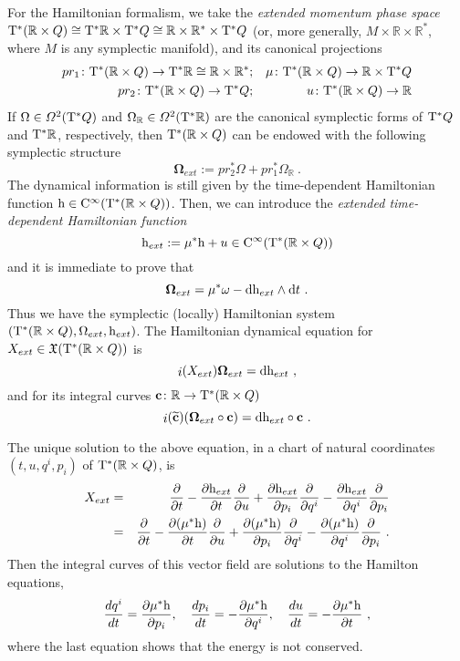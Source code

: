 \documentclass[12pt]{report}
\def\beann{\begin{eqnarray*}}
\def\eeann{\end{eqnarray*}}
\def\derpar#1#2{\frac{\partial{#1}}{\partial{#2}}}
\def\vf{\mathfrak X}
\def\df{{\mit\Omega}}
\def\d{{\rm d}}
\def\Real{\mathbb{R}}
\def\Tan{{\rm T}}
\def\inn{\mathop{i}\nolimits}
\def\Cinfty{{\rm C}^\infty}
\begin{document}
For the Hamiltonian formalism, we take the
{\sl extended momentum phase space}
$\Tan^*(\Real \times Q) \cong
 \Tan^*\Real\times\Tan^*Q \cong
 \Real \times \Real^*\times\Tan^*Q$
(or, more generally, $M \times \Real \times \Real^*$,
where $M$ is any symplectic manifold), and its  canonical projections
\beann
pr_1\colon\Tan^*(\Real \times Q)\to\Tan^*\Real \cong\Real \times \Real^*
&;&
\mu\colon \Tan^*(\Real \times Q) \to \Real\times\Tan^*Q
\\
pr_2\colon \Tan^*(\Real \times Q)\to \Tan^*Q
&;&
u\colon\Tan^*(\Real \times Q) \to \Real
\eeann
If $\Omega \in\df^2(\Tan^*Q)$ and $\Omega_{\Real} \in\df^2(\Tan^*\Real )$
are the canonical symplectic forms of $\Tan^*Q$ and $\Tan^*\Real $, respectively,
then $\Tan^*(\Real \times Q)$
can be endowed with the following symplectic structure
$$
{\mathbf \Omega}_{ext} := pr_2^* \Omega +pr_1^* \Omega_{\Real} \ .
$$
The dynamical information is still given by the time-dependent Hamiltonian function
${\rm h} \in \Cinfty(\Tan^*(\Real \times Q))$.
Then, we can introduce the {\sl extended time-dependent Hamiltonian function}
$$
{\rm h}_{ext} := \mu^* {\rm h} + u \in \Cinfty(\Tan^*(\Real \times Q))
$$
and it is immediate to prove that
$$
{\mathbf \Omega}_{ext} = \mu^* \omega - \d{\rm h}_{ext} \wedge\d t \ .
$$
Thus we have the symplectic (locally) Hamiltonian system
$(\Tan^*(\Real \times Q),\Omega_{ext},{\rm h}_{ext})$.
The Hamiltonian dynamical equation for $X_{ext}\in\vf(\Tan^*(\Real \times Q))$ is
$$
\inn(X_{ext}){\mathbf \Omega}_{ext} = \d{\rm h}_{ext}  \ ,
$$
and for its integral curves ${\bf c}\colon\Real\to\Tan^*(\Real\times Q)$ 
$$
\inn(\widetilde{\bf c})({\mathbf \Omega}_{ext}\circ{\bf c}) = \d{\rm h}_{ext}\circ{\bf c}  \ .
$$

The unique solution to the above equation, in a chart of natural coordinates
$(t,u,q^i,p_i)$ of $\Tan^*(\Real \times Q)$, is
\beann
X_{ext}&=&
\derpar{}{t} -
\derpar{{\rm h}_{ext}}{t}\derpar{}{u}+
\derpar{{\rm h}_{ext}}{p_i} \derpar{}{q^i} -
\derpar{{\rm h}_{ext}}{q^i} \derpar{}{p_i}
\\
&=&
\derpar{}{t} -
\derpar{(\mu^*{\rm h})}{t}\derpar{}{u}+
\derpar{(\mu^*{\rm h})}{p_i} \derpar{}{q^i} -
\derpar{(\mu^*{\rm h})}{q^i} \derpar{}{p_i} \ .
\eeann
Then the integral curves of this vector field are solutions to the  Hamilton equations,
$$
\frac{dq^i}{dt} = \derpar{\mu^*{\rm h}}{p_i} ,\quad
\frac{dp_i}{dt} = - \derpar{\mu^*{\rm h}}{q^i} ,\quad
\frac{du}{dt} = - \derpar{\mu^*{\rm h}}{t} \ ,
$$
where the last equation shows that the energy is not conserved.
\end{document}
